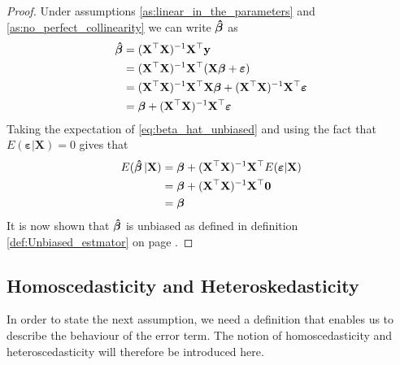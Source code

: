 \begin{proof}
    Under assumptions \ref{as:linear_in_the_parameters} and \ref{as:no_perfect_collinearity} we can write $\operatorname{\boldsymbol{\hat{\beta}}}$ as
    \begin{align}
        \operatorname{\boldsymbol{\hat{\beta}}} &= (\mathbf{X}^\top\mathbf{X})^{-1}\mathbf{X}^\top\mathbf{y} \nonumber\\
        &= (\mathbf{X}^\top\mathbf{X})^{-1}\mathbf{X}^\top(\mathbf{X}\boldsymbol{\beta} + \boldsymbol{\varepsilon}) \nonumber\\
        &=(\mathbf{X}^\top\mathbf{X})^{-1}\mathbf{X}^\top\mathbf{X}\boldsymbol{\beta} + (\mathbf{X}^\top\mathbf{X})^{-1}\mathbf{X}^\top\boldsymbol{\varepsilon} \nonumber\\
        &= \boldsymbol{\beta} + (\mathbf{X}^\top\mathbf{X})^{-1}\mathbf{X}^\top\boldsymbol{\varepsilon} \label{eq:beta_hat_unbiased}
    \end{align}
    Taking the expectation of \eqref{eq:beta_hat_unbiased} and using the fact that $E(\boldsymbol{\varepsilon} | \mathbf{X}) = 0$ gives that
    \begin{align*}
        E(\operatorname{\boldsymbol{\hat{\beta}}} | \mathbf{X}) &= \boldsymbol{\beta} + (\mathbf{X}^\top\mathbf{X})^{-1}\mathbf{X}^\top E(\boldsymbol{\varepsilon} | \mathbf{X}) \\
        &= \boldsymbol{\beta} + (\mathbf{X}^\top\mathbf{X})^{-1}\mathbf{X}^\top \mathbf{0} \\
        &= \boldsymbol{\beta}
    \end{align*}
    It is now shown that $\operatorname{\boldsymbol{\hat{\beta}}}$ is unbiased as defined in definition \ref{def:Unbiased_estmator} on page \pageref{def:Unbiased_estmator}.
\end{proof}

\subsection{Homoscedasticity and Heteroskedasticity}

In order to state the next assumption, we need a definition that enables us to describe the behaviour of the error term.
The notion of homoscedasticity and heteroscedasticity will therefore be introduced here.


